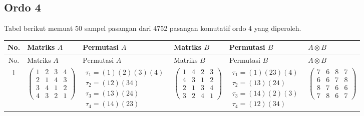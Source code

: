 \subsection*{Ordo 4}
Tabel berikut memuat 50 sampel pasangan dari 4752 pasangan komutatif ordo 4 yang diperoleh.

\begingroup
\footnotesize
\setlength{\tabcolsep}{3pt}
\renewcommand{\arraystretch}{1.25}
\begin{longtable}{|c|p{2.7cm}|p{2.7cm}|p{2.7cm}|p{2.7cm}|p{2.7cm}|}
    \hline
    No.                                                                                                            & Matriks $A$ & Permutasi $A$ & Matriks $B$ & Permutasi $B$ & $A \otimes B$ \\
    \hline
    \endfirsthead
    \hline
    No.                                                                                                            & Matriks $A$ & Permutasi $A$ & Matriks $B$ & Permutasi $B$ & $A \otimes B$ \\
    \hline
    \endhead
    1                                                                                                              &
    $\begin{pmatrix} 1 & 2 & 3 & 4 \\ 2 & 1 & 4 & 3 \\ 3 & 4 & 1 & 2 \\ 4 & 3 & 2 & 1 \end{pmatrix}$               &
    $\begin{array}{l}\tau_{1}=(1)(2)(3)(4)\\ \tau_{2}=(12)(34)\\ \tau_{3}=(13)(24)\\ \tau_{4}=(14)(23)\end{array}$ &
    $\begin{pmatrix} 1 & 4 & 2 & 3 \\ 4 & 3 & 1 & 2 \\ 2 & 1 & 3 & 4 \\ 3 & 2 & 4 & 1 \end{pmatrix}$               &
    $\begin{array}{l}\tau_{1}=(1)(23)(4)\\ \tau_{2}=(13)(24)\\ \tau_{3}=(14)(2)(3)\\ \tau_{4}=(12)(34)\end{array}$ &
    $\begin{pmatrix} 7 & 6 & 8 & 7 \\ 6 & 6 & 7 & 8 \\ 8 & 7 & 6 & 6 \\ 7 & 8 & 6 & 7 \end{pmatrix}$                                                                                           \\

\end{longtable}

